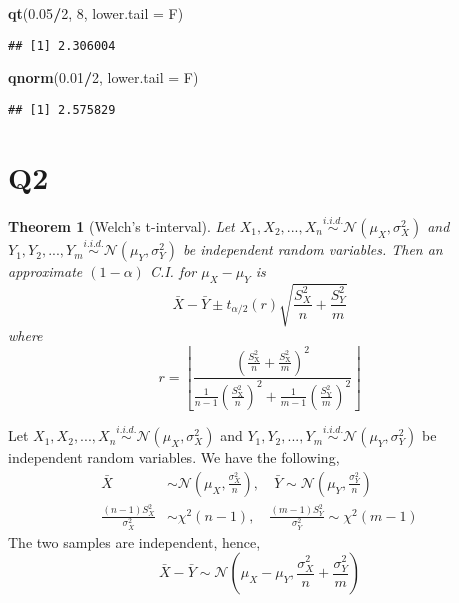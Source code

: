 \documentclass[
]{book}
\newenvironment{Shaded}{\begin{snugshade}}{\end{snugshade}}
\newcommand{\DataTypeTok}[1]{\textcolor[rgb]{0.13,0.29,0.53}{#1}}
\newcommand{\DecValTok}[1]{\textcolor[rgb]{0.00,0.00,0.81}{#1}}
\newcommand{\FloatTok}[1]{\textcolor[rgb]{0.00,0.00,0.81}{#1}}
\newcommand{\KeywordTok}[1]{\textcolor[rgb]{0.13,0.29,0.53}{\textbf{#1}}}
\newcommand{\NormalTok}[1]{#1}
\newcommand{\OperatorTok}[1]{\textcolor[rgb]{0.81,0.36,0.00}{\textbf{#1}}}
\newtheorem{theorem}{Theorem}[chapter]
\theoremstyle{definition}
\theoremstyle{definition}
\theoremstyle{definition}
\theoremstyle{remark}
\begin{document}
\begin{Shaded}
\begin{Highlighting}[]
\KeywordTok{qt}\NormalTok{(}\FloatTok{0.05}\OperatorTok{/}\DecValTok{2}\NormalTok{, }\DecValTok{8}\NormalTok{, }\DataTypeTok{lower.tail =}\NormalTok{ F)}
\end{Highlighting}
\end{Shaded}

\begin{verbatim}
## [1] 2.306004
\end{verbatim}

\begin{Shaded}
\begin{Highlighting}[]
\KeywordTok{qnorm}\NormalTok{(}\FloatTok{0.01}\OperatorTok{/}\DecValTok{2}\NormalTok{, }\DataTypeTok{lower.tail =}\NormalTok{ F)}
\end{Highlighting}
\end{Shaded}

\begin{verbatim}
## [1] 2.575829
\end{verbatim}

\hypertarget{q2}{%
\section{Q2}\label{q2}}

\begin{theorem}[Welch’s t-interval]
\protect\hypertarget{thm:unnamed-chunk-7}{}{\label{thm:unnamed-chunk-7} \iffalse (Welch's t-interval) \fi{} }Let \(X_1,X_2,...,X_n\stackrel{i.i.d.}{\sim}\mathcal{N}(\mu_X,\sigma^2_X)\) and \(Y_1,Y_2,...,Y_m\stackrel{i.i.d.}{\sim}\mathcal{N}(\mu_Y,\sigma^2_Y)\) be independent random variables. Then an approximate \((1-\alpha)\) C.I. for \(\mu_X-\mu_Y\) is
\[
  \bar{X}-\bar{Y} \pm t_{\alpha / 2}(r) \sqrt{\frac{S_{X}^{2}}{n}+\frac{S_{Y}^{2}}{m}}
\]
where
\[
  r=\left\lfloor\frac{\left(\frac{S_{\mathrm{X}}^{2}}{n}+\frac{S_{\mathrm{X}}^{2}}{m}\right)^{2}}{\frac{1}{n-1}\left(\frac{S_{\mathrm{X}}^{2}}{n}\right)^{2}+\frac{1}{m-1}\left(\frac{S_{\mathrm{Y}}^{2}}{m}\right)^{2}}\right\rfloor
\]
\end{theorem}

Let \(X_1,X_2,...,X_n\stackrel{i.i.d.}{\sim}\mathcal{N}(\mu_X,\sigma^2_X)\) and \(Y_1,Y_2,...,Y_m\stackrel{i.i.d.}{\sim}\mathcal{N}(\mu_Y,\sigma^2_Y)\) be independent random variables. We have the following,
\begin{align}
\bar X&\sim \mathcal{N}(\mu_X, \frac{\sigma_X^2}{n}), \quad 
\bar Y \sim \mathcal{N}(\mu_Y, \frac{\sigma_Y^2}{n})\\
\frac{(n-1)S^2_X}{\sigma_X^2} &\sim \chi^2(n-1), \quad \frac{(m-1)S^2_Y}{\sigma_Y^2} \sim \chi^2(m-1)
\end{align}
The two samples are independent, hence,
\begin{equation}
\bar X - \bar Y \sim \mathcal{N}(\mu_X-\mu_Y,\frac{\sigma_X^2}{n}+\frac{\sigma_Y^2}{m})
\end{equation}
\end{document}
